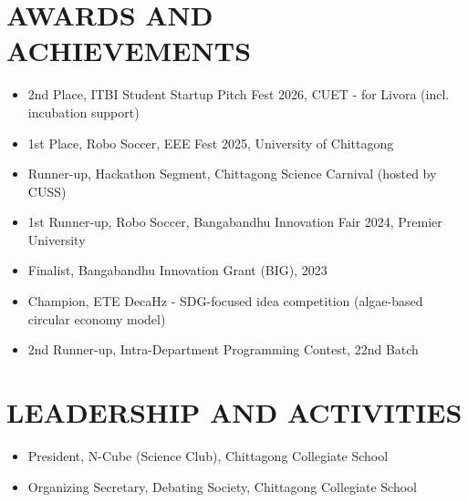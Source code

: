 \documentclass[10.5pt,a4paper]{article}
\newenvironment{tightitemize}{
  \begin{itemize}[leftmargin=15pt, itemsep=1pt, parsep=0pt, topsep=2pt]
}{
  \end{itemize}
}
\begin{document}
\section*{AWARDS AND ACHIEVEMENTS}
\begin{tightitemize}
  \item 2nd Place, ITBI Student Startup Pitch Fest 2026, CUET - for Livora (incl. incubation support)
  \item 1st Place, Robo Soccer, EEE Fest 2025, University of Chittagong
  \item Runner-up, Hackathon Segment, Chittagong Science Carnival (hosted by CUSS)
  \item 1st Runner-up, Robo Soccer, Bangabandhu Innovation Fair 2024, Premier University
  \item Finalist, Bangabandhu Innovation Grant (BIG), 2023
  \item Champion, ETE DecaHz - SDG-focused idea competition (algae-based circular economy model)
  \item 2nd Runner-up, Intra-Department Programming Contest, 22nd Batch
\end{tightitemize}

\section*{LEADERSHIP AND ACTIVITIES}
\begin{tightitemize}
  \item President, N-Cube (Science Club), Chittagong Collegiate School
  \item Organizing Secretary, Debating Society, Chittagong Collegiate School
\end{tightitemize}
\end{document}
